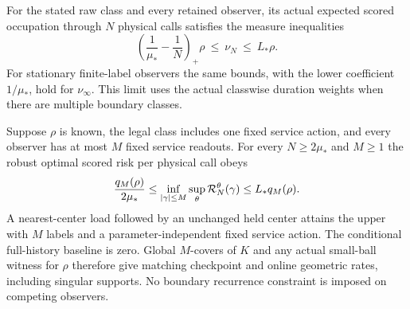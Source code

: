 \begin{theorem}\label{thm:controlled-load}
For the stated raw class and every retained observer, its actual expected scored occupation through $N$ physical calls satisfies the measure inequalities
\begin{equation}\label{eq:load-occupation}
 \left(\frac1{\mu_*}-\frac1N\right)_+\rho
       \ \le\ \nu_N\ \le\ L_*\rho.
\end{equation}
For stationary finite-label observers the same bounds, with the lower coefficient $1/\mu_*$, hold for $\nu_\infty$. This limit uses the actual classwise duration weights when there are multiple boundary classes.

Suppose $\rho$ is known, the legal class includes one fixed service action, and every observer has at most $M$ fixed service readouts. For every $N\ge2\mu_*$ and $M\ge1$ the robust optimal scored risk per physical call obeys
\begin{equation}\label{eq:load-risk}
 \frac{q_M(\rho)}{2\mu_*}
 \le\inf_{|\gamma|\le M}\sup_\theta\mathcal R_N^\theta(\gamma)
 \le L_*q_M(\rho).
\end{equation}
A nearest-center load followed by an unchanged held center attains the upper with $M$ labels and a parameter-independent fixed service action. The conditional full-history baseline is zero. Global $M$-covers of $K$ and any actual small-ball witness for $\rho$ therefore give matching checkpoint and online geometric rates, including singular supports. No boundary recurrence constraint is imposed on competing observers.
\end{theorem}
